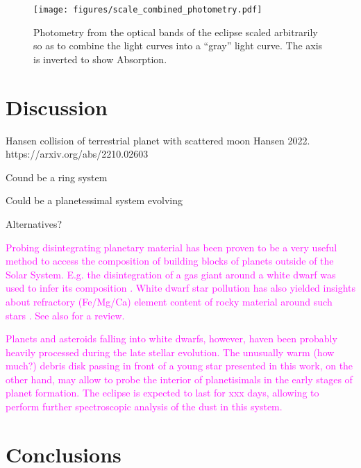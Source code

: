\documentclass{aa}
\begin{document}
\begin{figure*}
   \begin{centering}
   \texttt{[image: figures/scale\_combined\_photometry.pdf]}
      \caption{Photometry from the optical bands of the eclipse scaled arbitrarily so as to combine the light curves into a ``gray'' light curve.
      The axis is inverted to show Absorption.
              }
              \label{fig:allphot}
              \end{centering}
       \end{figure*}



\section{Discussion}\label{sec:discussion}

Hansen collision of terrestrial planet with scattered moon Hansen 2022. https://arxiv.org/abs/2210.02603

Cound be a ring system

Could be a planetessimal system evolving

Alternatives?

\textcolor{magenta}{Probing disintegrating planetary material has been proven to be a very useful method to access the composition of building blocks of planets outside of the Solar System. E.g. the disintegration of a gas giant around a white dwarf was used to infer its composition \citep{Gaensike2019}. White dwarf star pollution has also yielded insights about refractory (Fe/Mg/Ca) element content of rocky  material around such stars \citep{Turner2020,Putirka2021,Blouin2020}. See also \cite{Veras2021} for a review.}

\textcolor{magenta}{Planets and asteroids falling into white dwarfs, however, haven been probably heavily processed during the late stellar evolution. The unusually warm (how much?) debris disk passing in front of a young star presented in this work, on the other hand, may allow to probe the interior of planetisimals in the early stages of planet formation. The eclipse is expected to last for xxx days, allowing to perform further spectroscopic analysis of the dust in this system.}

\section{Conclusions}\label{sec:conclusion}
\end{document}
